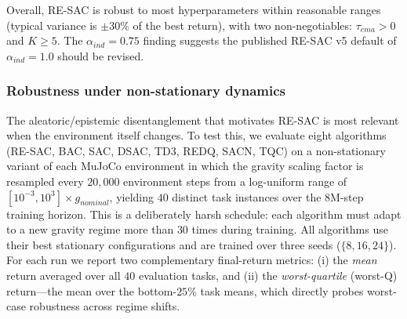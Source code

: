 \documentclass[10pt]{article}
\begin{document}
Overall, RE-SAC is robust to most hyperparameters within reasonable ranges (typical variance is $\pm 30\%$ of the best return), with two non-negotiables: $\tau_{ema}{>}0$ and $K{\geq}5$. The $\alpha_{ind}{=}0.75$ finding suggests the published RE-SAC v5 default of $\alpha_{ind}{=}1.0$ should be revised.

\subsubsection{Robustness under non-stationary dynamics}
\label{sec:nonstationary}
The aleatoric/epistemic disentanglement that motivates RE-SAC is most relevant when the environment itself changes. To test this, we evaluate eight algorithms (RE-SAC, BAC, SAC, DSAC, TD3, REDQ, SACN, TQC) on a non-stationary variant of each MuJoCo environment in which the gravity scaling factor is resampled every $20{,}000$ environment steps from a log-uniform range of $[10^{-3}, 10^{3}]\times g_{nominal}$, yielding $40$ distinct task instances over the $8\mathrm{M}$-step training horizon. This is a deliberately harsh schedule: each algorithm must adapt to a new gravity regime more than $30$ times during training. All algorithms use their best stationary configurations and are trained over three seeds ($\{8,16,24\}$). For each run we report two complementary final-return metrics: (i) the \emph{mean} return averaged over all $40$ evaluation tasks, and (ii) the \emph{worst-quartile} (worst-Q) return---the mean over the bottom-$25\%$ task means, which directly probes worst-case robustness across regime shifts.
\end{document}
